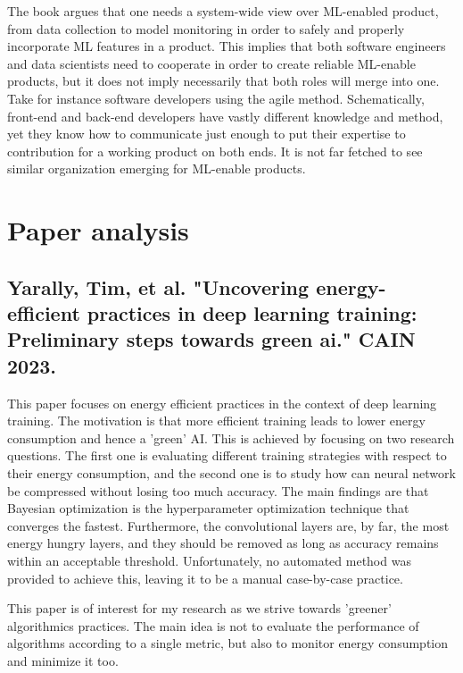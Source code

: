 \documentclass[11pt]{article}
\begin{document}
\medskip

The book argues that one needs a system-wide view over ML-enabled product, from data collection to model monitoring in order to safely and properly incorporate ML features in a product. This implies that both software engineers and data scientists need to cooperate in order to create reliable ML-enable products, but it does not imply necessarily that both roles will merge into one. Take for instance software developers using the agile method. Schematically, front-end and back-end developers have vastly different knowledge and method, yet they know how to communicate just enough to put their expertise to contribution for a working product on both ends. It is not far fetched to see similar organization emerging for ML-enable products.


\section{Paper analysis}
\subsection{Yarally, Tim, et al. "Uncovering energy-efficient practices in deep learning training: Preliminary steps towards green ai." CAIN 2023.}
This paper focuses on energy efficient practices in the context of deep learning training. The motivation is that more efficient training leads to lower energy consumption and hence a 'green' AI. This is achieved by focusing on two research questions. The first one is evaluating different training strategies with respect to their energy consumption, and the second one is to study how can neural network be compressed without losing too much accuracy. The main findings are that Bayesian optimization is the hyperparameter optimization technique that converges the fastest. Furthermore, the convolutional layers are, by far, the most energy hungry layers, and they should be removed as long as accuracy remains within an acceptable threshold. Unfortunately, no automated method was provided to achieve this, leaving it to be a manual case-by-case practice.

\medskip

This paper is of interest for my research as we strive towards 'greener' algorithmics practices. The main idea is not to evaluate the performance of algorithms according to a single metric, but also to monitor energy consumption and minimize it too.

\medskip
\end{document}
